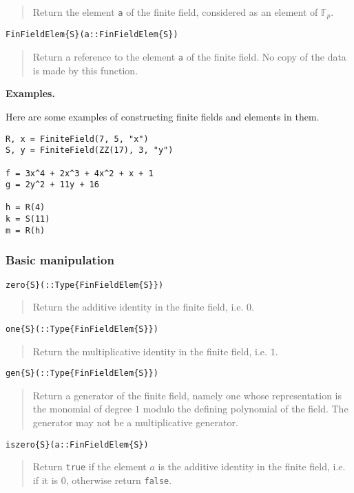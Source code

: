 \documentclass[a4paper,10pt]{article}
\newcommand{\F}{\mathbb{F}}
\newcommand{\code}{\lstinline}
\newcommand{\desc}[1]{\vspace{-3mm}\begin{quote}#1\end{quote}}
\begin{document}
{{\desc{Return the element \code{a} of the finite field, considered as an element
of $\F_p$.}

\begin{lstlisting}
FinFieldElem{S}(a::FinFieldElem{S})
\end{lstlisting}

\desc{Return a reference to the element \code{a} of the finite field. No copy
of the data is made by this function.}

\textbf{Examples.}

Here are some examples of constructing finite fields and elements in them.

\begin{lstlisting}
R, x = FiniteField(7, 5, "x")
S, y = FiniteField(ZZ(17), 3, "y")

f = 3x^4 + 2x^3 + 4x^2 + x + 1
g = 2y^2 + 11y + 16

h = R(4)
k = S(11)
m = R(h)
\end{lstlisting}

\subsubsection{Basic manipulation}

\begin{lstlisting}
zero{S}(::Type{FinFieldElem{S}})
\end{lstlisting}

\desc{Return the additive identity in the finite field, i.e. $0$.}

\begin{lstlisting}
one{S}(::Type{FinFieldElem{S}})
\end{lstlisting}

\desc{Return the multiplicative identity in the finite field, i.e. $1$.}

\begin{lstlisting}
gen{S}(::Type{FinFieldElem{S}})
\end{lstlisting}

\desc{Return a generator of the finite field, namely one whose
representation is the monomial of degree $1$ modulo the defining
polynomial of the field. The generator may not be a multiplicative
generator.}

\begin{lstlisting}
iszero{S}(a::FinFieldElem{S})
\end{lstlisting}

\desc{Return \code{true} if the element $a$ is the additive identity in the
finite field, i.e. if it is $0$, otherwise return \code{false}.}

}}
\end{document}
